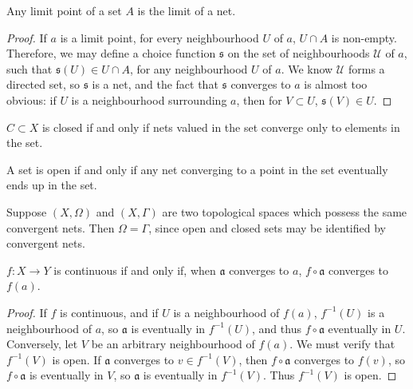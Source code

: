 \begin{example}
\begin{lemma}
    Any limit point of a set $A$ is the limit of a net.
\end{lemma}
\begin{proof}
    If $a$ is a limit point, for every neighbourhood $U$ of $a$, $U \cap A$ is non-empty. Therefore, we may define a choice function $\mathfrak{s}$ on the set of neighbourhoods $\mathcal{U}$ of $a$, such that $\mathfrak{s}(U) \in U \cap A$, for any neighbourhood $U$ of $a$. We know $\mathcal{U}$ forms a directed set, so $\mathfrak{s}$ is a net, and the fact that $\mathfrak{s}$ converges to $a$ is almost too obvious: if $U$ is a neighbourhood surrounding $a$, then for $V \subset U$, $\mathfrak{s}(V) \in U$.
\end{proof}

\begin{corollary}
    $C \subset X$ is closed if and only if nets valued in the set converge only to elements in the set.
\end{corollary}

\begin{corollary}
    A set is open if and only if any net converging to a point in the set eventually ends up in the set.
\end{corollary}

Suppose $(X, \Omega)$ and $(X,\Gamma)$ are two topological spaces which possess the same convergent nets. Then $\Omega = \Gamma$, since open and closed sets may be identified by convergent nets.

\begin{lemma}
    $f:X \to Y$ is continuous if and only if, when $\mathfrak{a}$ converges to $a$, $f \circ \mathfrak{a}$ converges to $f(a)$.
\end{lemma}
\begin{proof}
    If $f$ is continuous, and if $U$ is a neighbourhood of $f(a)$, $f^{-1}(U)$ is a neighbourhood of $a$, so $\mathfrak{a}$ is eventually in $f^{-1}(U)$, and thus $f \circ \mathfrak{a}$ eventually in $U$. Conversely, let $V$ be an arbitrary neighbourhood of $f(a)$. We must verify that $f^{-1}(V)$ is open. If $\mathfrak{a}$ converges to $v \in f^{-1}(V)$, then $f \circ \mathfrak{a}$ converges to $f(v)$, so $f \circ \mathfrak{a}$ is eventually in $V$, so $\mathfrak{a}$ is eventually in $f^{-1}(V)$. Thus $f^{-1}(V)$ is open.
\end{proof}


\end{example}
